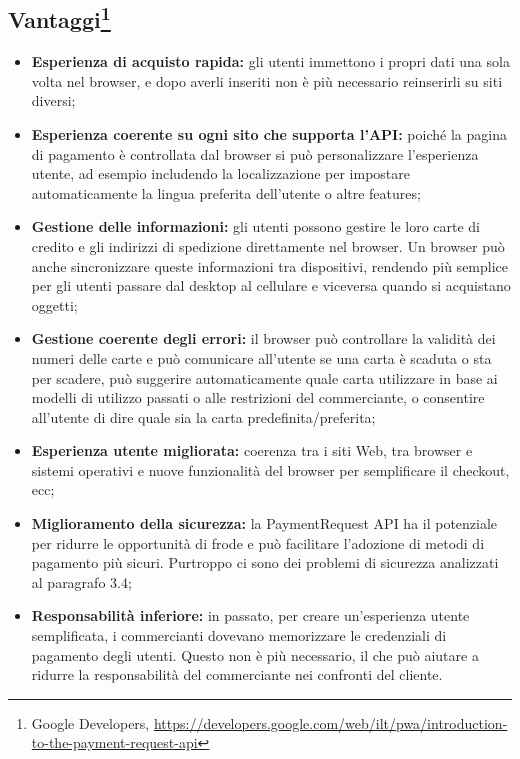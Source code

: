\documentclass[11pt ,a4paper , twoside , openright ]{book}
\begin{document}
	\subsection[Vantaggi]{Vantaggi\footnote{Google Developers, \url{https://developers.google.com/web/ilt/pwa/introduction-to-the-payment-request-api}}}
	\begin{itemize}
		\item \textbf{Esperienza di acquisto rapida:} gli utenti immettono i propri dati una sola volta nel browser, e dopo averli inseriti non è più necessario reinserirli su siti diversi;
		\item \textbf{Esperienza coerente su ogni sito che supporta l'API:} poiché la pagina di pagamento è controllata dal browser si può personalizzare l'esperienza utente, ad esempio includendo la localizzazione per impostare automaticamente la lingua preferita dell'utente o altre features;
		\item \textbf{Gestione delle informazioni:} gli utenti possono gestire le loro carte di credito e gli indirizzi di spedizione direttamente nel browser. Un browser può anche sincronizzare queste informazioni tra dispositivi, rendendo più semplice per gli utenti passare dal desktop al cellulare e viceversa quando si acquistano oggetti;
		\item \textbf{Gestione coerente degli errori:} il browser può controllare la validità dei numeri delle carte e può comunicare all'utente se una carta è scaduta o sta per scadere, può suggerire automaticamente quale carta utilizzare in base ai modelli di utilizzo passati o alle restrizioni del commerciante, o consentire all'utente di dire quale sia la carta predefinita/preferita;
		\item \textbf{Esperienza utente migliorata:} coerenza tra i siti Web, tra browser e sistemi operativi e nuove funzionalità del browser per semplificare il checkout, ecc;
		\item \textbf{Miglioramento della sicurezza:} la PaymentRequest API ha il potenziale per ridurre le opportunità di frode e può facilitare l'adozione di metodi di pagamento più sicuri. Purtroppo ci sono dei problemi di sicurezza analizzati al paragrafo 3.4; 
		\item \textbf{Responsabilità inferiore:} in passato, per creare un'esperienza utente semplificata, i commercianti dovevano memorizzare le credenziali di pagamento degli utenti. Questo non è più necessario, il che può aiutare a ridurre la responsabilità del commerciante nei confronti del cliente.
	\end{itemize}
	
\end{document}
